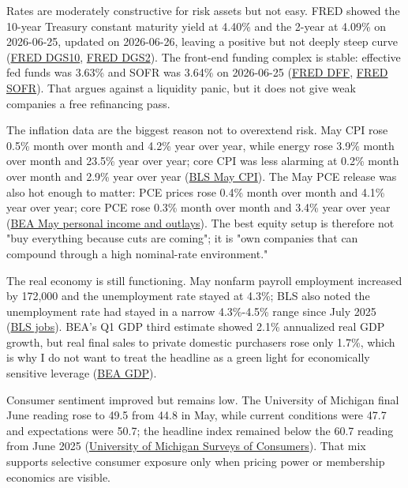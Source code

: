 \documentclass[
  9pt,
]{article}
\begin{document}
Rates are moderately constructive for risk assets but not easy. FRED
showed the 10-year Treasury constant maturity yield at 4.40\% and the
2-year at 4.09\% on 2026-06-25, updated on 2026-06-26, leaving a
positive but not deeply steep curve
(\href{https://fred.stlouisfed.org/series/DGS10}{FRED DGS10},
\href{https://fred.stlouisfed.org/series/DGS2}{FRED DGS2}). The
front-end funding complex is stable: effective fed funds was 3.63\% and
SOFR was 3.64\% on 2026-06-25
(\href{https://fred.stlouisfed.org/series/DFF}{FRED DFF},
\href{https://fred.stlouisfed.org/series/SOFR}{FRED SOFR}). That argues
against a liquidity panic, but it does not give weak companies a free
refinancing pass.

The inflation data are the biggest reason not to overextend risk. May
CPI rose 0.5\% month over month and 4.2\% year over year, while energy
rose 3.9\% month over month and 23.5\% year over year; core CPI was less
alarming at 0.2\% month over month and 2.9\% year over year
(\href{https://www.bls.gov/news.release/cpi.nr0.htm}{BLS May CPI}). The
May PCE release was also hot enough to matter: PCE prices rose 0.4\%
month over month and 4.1\% year over year; core PCE rose 0.3\% month
over month and 3.4\% year over year
(\href{https://www.bea.gov/news/2026/personal-income-and-outlays-may-2026}{BEA
May personal income and outlays}). The best equity setup is therefore
not "buy everything because cuts are coming"; it is "own companies that
can compound through a high nominal-rate environment."

The real economy is still functioning. May nonfarm payroll employment
increased by 172,000 and the unemployment rate stayed at 4.3\%; BLS also
noted the unemployment rate had stayed in a narrow 4.3\%-4.5\% range
since July 2025
(\href{https://www.bls.gov/news.release/empsit.nr0.htm}{BLS jobs}).
BEA's Q1 GDP third estimate showed 2.1\% annualized real GDP growth, but
real final sales to private domestic purchasers rose only 1.7\%, which
is why I do not want to treat the headline as a green light for
economically sensitive leverage
(\href{https://www.bea.gov/news/2026/gdp-third-estimate-industries-corporate-profits-state-gdp-and-state-personal-income-1st}{BEA
GDP}).

Consumer sentiment improved but remains low. The University of Michigan
final June reading rose to 49.5 from 44.8 in May, while current
conditions were 47.7 and expectations were 50.7; the headline index
remained below the 60.7 reading from June 2025
(\href{https://www.sca.isr.umich.edu/}{University of Michigan Surveys of
Consumers}). That mix supports selective consumer exposure only when
pricing power or membership economics are visible.
\end{document}
